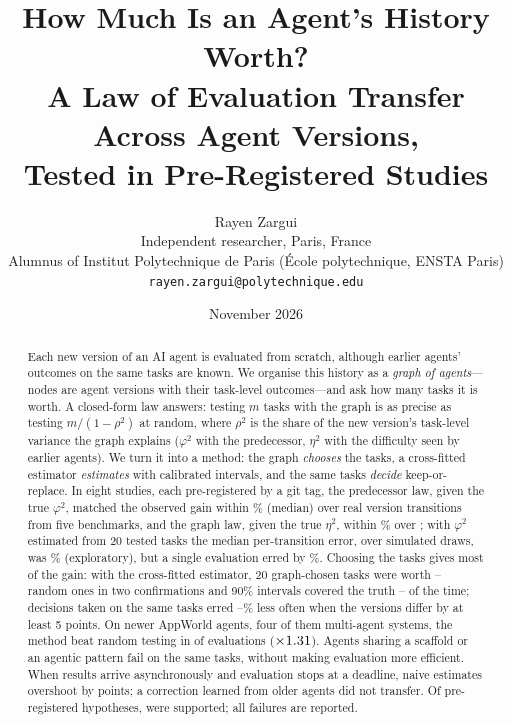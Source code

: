 \documentclass[11pt]{article}
\title{How Much Is an Agent's History Worth?\\[2pt]
\large A Law of Evaluation Transfer Across Agent Versions,\\ Tested in Pre-Registered Studies}
\author{Rayen Zargui\\
Independent researcher, Paris, France\\
{\small Alumnus of Institut Polytechnique de Paris (\'Ecole polytechnique, ENSTA Paris)}\\
\texttt{rayen.zargui@polytechnique.edu}}
\date{November 2026}
\newcommand{\phisq}{\varphi^2}
\begin{document}
\maketitle

\begin{abstract}
Each new version of an AI agent is evaluated from scratch, although earlier agents' outcomes on the same tasks are
known. We organise this history as a \emph{graph of agents}---nodes are agent
versions with their task-level outcomes---and ask how many tasks it is worth. A closed-form
law answers: testing $m$ tasks with the graph is as precise as testing $m/(1-\rho^2)$ at random, where $\rho^2$ is
the share of the new version's task-level variance the graph explains ($\phisq$ with the predecessor, $\eta^2$ with the
difficulty seen by earlier agents). We turn it into a method: the graph \emph{chooses} the tasks, a cross-fitted
estimator \emph{estimates} with calibrated intervals, and the same tasks \emph{decide} keep-or-replace. In eight studies, each pre-registered by a git tag, the predecessor law, given the true $\phisq$, matched the observed gain within \LawErrPooled\% (median) over \NConf{} real version transitions from five benchmarks, and the graph law, given the true $\eta^2$, within \StratErrPooled\% over \StratN; with $\phisq$ estimated from 20 tested tasks the median per-transition error, over simulated draws, was \PhiHatErr\% (exploratory), but a single evaluation erred by \PhiHatSingle\%. Choosing the tasks gives most of the gain:
with the cross-fitted estimator, 20 graph-chosen tasks were worth \EquivProbesFive--\EquivProbesSix{} random ones in
two confirmations and 90\% intervals covered the truth \CovGregSix--\CovEight{} of the time; decisions taken on the same tasks erred \DecRedSix--\DecRedFour\% less often when the versions differ by at least
5 points. On \NEightAgents{} newer AppWorld agents, four of them multi-agent systems, the method beat random testing in \GEightWins{} of \NEight{} evaluations ($\times1.31$). Agents
sharing a scaffold or an agentic pattern fail on the same tasks, without making evaluation more efficient.
When results arrive asynchronously and evaluation stops at a deadline, naive estimates overshoot by \BiasNaiveEight{}
points; a correction learned from older agents did not transfer. Of \HypTotal{} pre-registered hypotheses,
\HypSupported{} were supported; all failures are reported.
\end{abstract}
\end{document}
